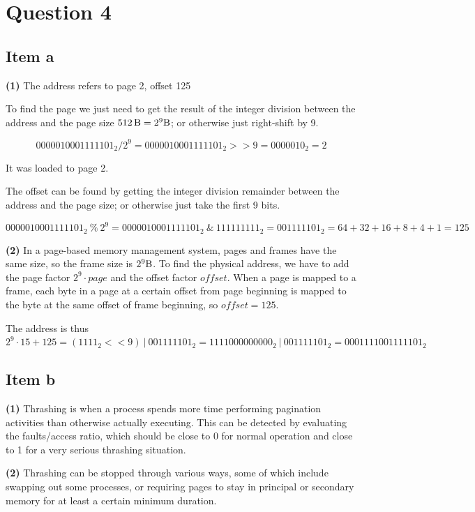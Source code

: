 {\section{Question 4}
\subsection{Item a}
\textbf{(1)} The address refers to page 2, offset 125

To find the page we just need to get the result of the integer division between the address and the page size $\SI{512}{\byte}=2^9\SI{}{\byte}$; or otherwise just right-shift by 9.

\begin{equation*}
    0000010001111101_2 / 2^9 = 0000010001111101_2 >> 9 = 0000010_2 = 2
\end{equation*}

It was loaded to page 2.

The offset can be found by getting the integer division remainder between the address and the page size; or otherwise just take the first 9 bits.

\begin{equation*}
    0000010001111101_2~\%~2^9 = 0000010001111101_2~\&~111111111_2 = 001111101_2 = 64+32+16+8+4+1 = 125 
\end{equation*}

\textbf{(2)} In a page-based memory management system, pages and frames have the same size, so the frame size is $2^9\SI{}{\byte}$. To find the physical address, we have to add the page factor $2^9 \cdot page$ and the offset factor $offset$. When a page is mapped to a frame, each byte in a page at a certain offset from page beginning is mapped to the byte at the same offset of frame beginning, so $offset=125$.

The address is thus $2^9 \cdot 15 + 125 = (1111_2 << 9)~|~001111101_2 = 1111000000000_2~|~001111101_2 = 0001111001111101_2 $

\subsection{Item b}
\textbf{(1)} Thrashing is when a process spends more time performing pagination activities than otherwise actually executing. This can be detected by evaluating the faults/access ratio, which should be close to 0 for normal operation and close to 1 for a very serious thrashing situation.

\textbf{(2)} Thrashing can be stopped through various ways, some of which include swapping out some processes, or requiring pages to stay in principal or secondary memory for at least a certain minimum duration.

}
